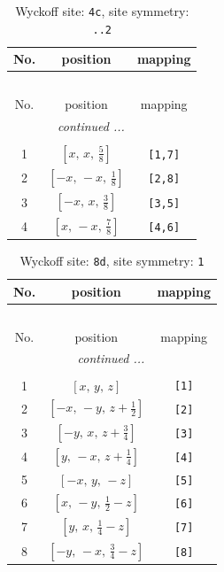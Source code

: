 \documentclass[fleqn,8pt]{jsarticle}
\begin{document}
\renewcommand{\arraystretch}{1.2}
\begin{longtable}{ccc}
\caption{Wyckoff site: {\tt 4c}, site symmetry: {\tt ..2}}
 \\
 \hline \hline
No. & position & mapping \\ \hline \endfirsthead

\multicolumn{2}{l}{\tablename\ \thetable{}} \\
 \hline \hline
No. & position & mapping \\ \hline \endhead

 \hline \hline
\multicolumn{2}{r}{\footnotesize\it continued ...} \\ \endfoot

 \hline \hline
\multicolumn{2}{r}{} \\ \endlastfoot

1 & $\left[ x,\, x,\, \frac{5}{8} \right]$ & {\tt [1,7]} \\ \hline
2 & $\left[ - x,\, - x,\, \frac{1}{8} \right]$ & {\tt [2,8]} \\ \hline
3 & $\left[ - x,\, x,\, \frac{3}{8} \right]$ & {\tt [3,5]} \\ \hline
4 & $\left[ x,\, - x,\, \frac{7}{8} \right]$ & {\tt [4,6]} \\
\end{longtable}
\renewcommand{\arraystretch}{1.2}
\begin{longtable}{ccc}
\caption{Wyckoff site: {\tt 8d}, site symmetry: {\tt 1}}
 \\
 \hline \hline
No. & position & mapping \\ \hline \endfirsthead

\multicolumn{2}{l}{\tablename\ \thetable{}} \\
 \hline \hline
No. & position & mapping \\ \hline \endhead

 \hline \hline
\multicolumn{2}{r}{\footnotesize\it continued ...} \\ \endfoot

 \hline \hline
\multicolumn{2}{r}{} \\ \endlastfoot

1 & $\left[ x,\, y,\, z \right]$ & {\tt [1]} \\ \hline
2 & $\left[ - x,\, - y,\, z + \frac{1}{2} \right]$ & {\tt [2]} \\ \hline
3 & $\left[ - y,\, x,\, z + \frac{3}{4} \right]$ & {\tt [3]} \\ \hline
4 & $\left[ y,\, - x,\, z + \frac{1}{4} \right]$ & {\tt [4]} \\ \hline
5 & $\left[ - x,\, y,\, - z \right]$ & {\tt [5]} \\ \hline
6 & $\left[ x,\, - y,\, \frac{1}{2} - z \right]$ & {\tt [6]} \\ \hline
7 & $\left[ y,\, x,\, \frac{1}{4} - z \right]$ & {\tt [7]} \\ \hline
8 & $\left[ - y,\, - x,\, \frac{3}{4} - z \right]$ & {\tt [8]} \\
\end{longtable}
\end{document}
